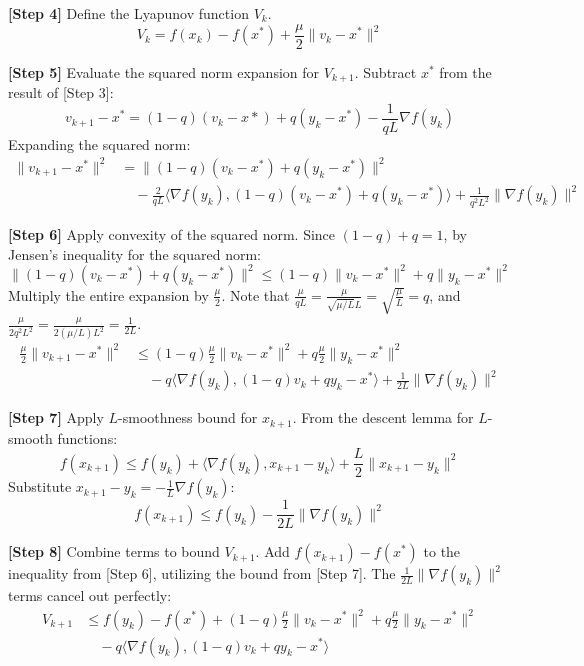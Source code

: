 \documentclass[11pt]{article}
\begin{document}
\textbf{[Step 4]} Define the Lyapunov function $V_k$.
$$V_k = f(x_k) - f(x^*) + \frac{\mu}{2}\|v_k - x^*\|^2$$

\textbf{[Step 5]} Evaluate the squared norm expansion for $V_{k+1}$.
Subtract $x^*$ from the result of [Step 3]:
$$v_{k+1} - x^* = (1-q)(v_k - x*) + q(y_k - x^*) - \frac{1}{qL}\nabla f(y_k)$$
Expanding the squared norm:
\begin{align*}
    \|v_{k+1} - x^*\|^2 &= \|(1-q)(v_k - x^*) + q(y_k - x^*)\|^2 \\
    &\quad - \frac{2}{qL}\langle \nabla f(y_k), (1-q)(v_k - x^*) + q(y_k - x^*) \rangle + \frac{1}{q^2 L^2}\|\nabla f(y_k)\|^2
\end{align*}

\textbf{[Step 6]} Apply convexity of the squared norm.
Since $(1-q) + q = 1$, by Jensen's inequality for the squared norm:
$$\|(1-q)(v_k - x^*) + q(y_k - x^*)\|^2 \le (1-q)\|v_k - x^*\|^2 + q\|y_k - x^*\|^2$$
Multiply the entire expansion by $\frac{\mu}{2}$. Note that $\frac{\mu}{qL} = \frac{\mu}{\sqrt{\mu/L}L} = \sqrt{\frac{\mu}{L}} = q$, and $\frac{\mu}{2q^2 L^2} = \frac{\mu}{2(\mu/L)L^2} = \frac{1}{2L}$.
\begin{align*}
    \frac{\mu}{2}\|v_{k+1} - x^*\|^2 &\le (1-q)\frac{\mu}{2}\|v_k - x^*\|^2 + q\frac{\mu}{2}\|y_k - x^*\|^2 \\
    &\quad - q\langle \nabla f(y_k), (1-q)v_k + qy_k - x^* \rangle + \frac{1}{2L}\|\nabla f(y_k)\|^2
\end{align*}

\textbf{[Step 7]} Apply $L$-smoothness bound for $x_{k+1}$.
From the descent lemma for $L$-smooth functions:
$$f(x_{k+1}) \le f(y_k) + \langle \nabla f(y_k), x_{k+1} - y_k \rangle + \frac{L}{2}\|x_{k+1} - y_k\|^2$$
Substitute $x_{k+1} - y_k = -\frac{1}{L}\nabla f(y_k)$:
$$f(x_{k+1}) \le f(y_k) - \frac{1}{2L}\|\nabla f(y_k)\|^2$$

\textbf{[Step 8]} Combine terms to bound $V_{k+1}$.
Add $f(x_{k+1}) - f(x^*)$ to the inequality from [Step 6], utilizing the bound from [Step 7]. The $\frac{1}{2L}\|\nabla f(y_k)\|^2$ terms cancel out perfectly:
\begin{align*}
    V_{k+1} &\le f(y_k) - f(x^*) + (1-q)\frac{\mu}{2}\|v_k - x^*\|^2 + q\frac{\mu}{2}\|y_k - x^*\|^2 \\
    &\quad - q\langle \nabla f(y_k), (1-q)v_k + qy_k - x^* \rangle
\end{align*}
\end{document}
